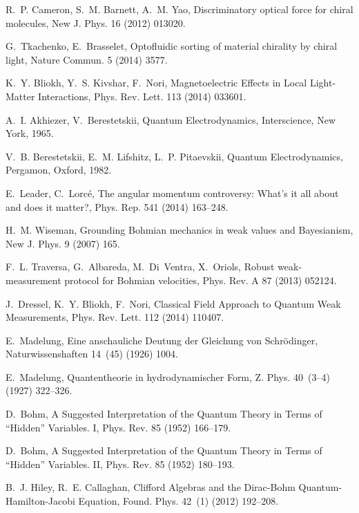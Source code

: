 \documentclass[1p,sort&compress]{elsarticle}
\numberwithin{equation}{section}
\begin{document}
\begin{thebibliography}{999}
R.~P. Cameron, S.~M. Barnett, A.~M. Yao, {Discriminatory optical force for
  chiral molecules}, New J. Phys. 16 (2012) 013020.

G.~Tkachenko, E.~Brasselet, {Optofluidic sorting of material chirality by
  chiral light}, Nature Commun. 5 (2014) 3577.

K.~Y. Bliokh, Y.~S. Kivshar, F.~Nori, {Magnetoelectric Effects in Local
  Light-Matter Interactions}, Phys. Rev. Lett. 113 (2014) 033601.

A.~I. Akhiezer, V.~Berestetskii, Quantum Electrodynamics, Interscience, New
  York, 1965.

V.~B. Berestetskii, E.~M. Lifshitz, L.~P. Pitaevskii, {Quantum
  Electrodynamics}, Pergamon, Oxford, 1982.

E.~Leader, C.~Lorc\'e, {The angular momentum controversy: What's it all about
  and does it matter?}, Phys. Rep. 541 (2014) 163--248.

H.~M. Wiseman, {Grounding Bohmian mechanics in weak values and Bayesianism},
  New J. Phys. 9 (2007) 165.

F.~L. Traversa, G.~Albareda, M.~Di~Ventra, X.~Oriols, {Robust weak-measurement
  protocol for Bohmian velocities}, Phys. Rev. A 87 (2013) 052124.

J.~Dressel, K.~Y. Bliokh, F.~Nori, {Classical Field Approach to Quantum Weak
  Measurements}, Phys. Rev. Lett. 112 (2014) 110407.

E.~Madelung, {Eine anschauliche Deutung der Gleichung von Schr\"{o}dinger},
  Naturwissenshaften 14~(45) (1926) 1004.

E.~Madelung, {Quantentheorie in hydrodynamischer Form}, Z. Phys. 40~(3--4)
  (1927) 322--326.

D.~Bohm, {A Suggested Interpretation of the Quantum Theory in Terms of
  ``Hidden'' Variables. I}, Phys. Rev. 85 (1952) 166--179.

D.~Bohm, {A Suggested Interpretation of the Quantum Theory in Terms of
  ``Hidden'' Variables. II}, Phys. Rev. 85 (1952) 180--193.

B.~J. Hiley, R.~E. Callaghan, {Clifford Algebras and the Dirac-Bohm
  Quantum-Hamilton-Jacobi Equation}, Found. Phys. 42~(1) (2012) 192--208.


\end{thebibliography}
\end{document}

